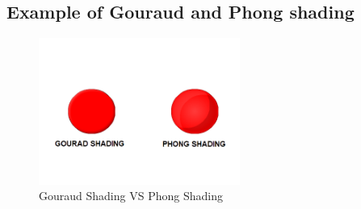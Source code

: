 \documentclass{article}
\begin{document}
\subsection{Example of Gouraud and Phong shading}
\begin{figure}[htbp]
    \begin{center}
        \includegraphics*[width=6.6cm]{SHADING.png}
        \caption{Gouraud Shading VS Phong Shading}
    \end{center}
\end{figure}
\end{document}
